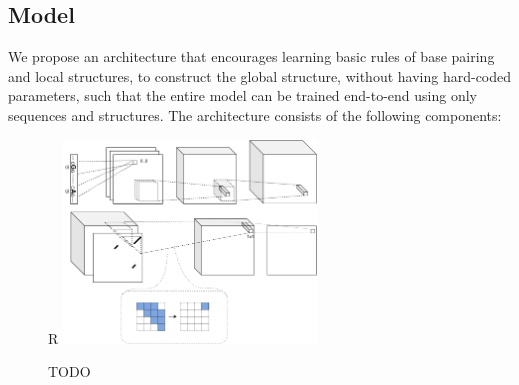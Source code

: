 \documentclass{article}
\begin{document}


\subsection{Model}

We propose an architecture that encourages learning
basic rules of base pairing and local structures, to construct the global structure,
without having hard-coded parameters,
such that the entire model can be trained end-to-end using only sequences and structures.
The architecture consists of the following components:

\begin{figure}{R}
        \centering
        \includegraphics[width=0.6\textwidth]{plot/nn_arch_1.pdf}
        \caption{TODO}
        \label{fig:nn_arch_1}
        \centering
\end{figure}


\end{document}
